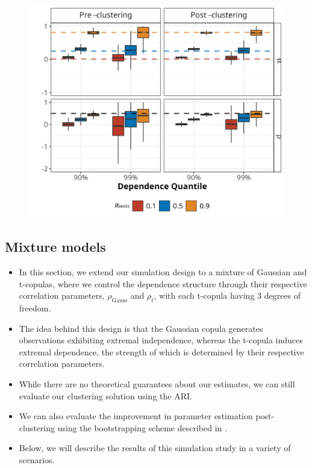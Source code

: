 \documentclass{article}
\numberwithin{equation}{section}
\begin{document}
\begin{figure}[H]
    \centering
    \includegraphics[width = 0.9\linewidth]{plots/sim_01_gauss_cop.png}
    \caption{\emph{}}
    \label{fig:00_gauss_cop}
\end{figure}


\subsection{Mixture models} \label{subsec:sim_mixture}

\begin{itemize}
  \item In this section, we extend our simulation design to a mixture of Gaussian and t-copulas, where we control the dependence structure through their respective correlation parameters, $\rho_{\text{Gauss}}$ and $\rho_{t}$, with each t-copula having 3 degrees of freedom.
  \item The idea behind this design is that the Gaussian copula generates observations exhibiting extremal independence, whereas the t-copula induces extremal dependence, the strength of which is determined by their respective correlation parameters.
  \item While there are no theoretical guarantees about our estimates, we can still evaluate our clustering solution using the ARI.
  \item We can also evaluate the improvement in parameter estimation post-clustering using the bootstrapping scheme described in \cite{Heffernan2004}.
  \item Below, we will describe the results of this simulation study in a variety of scenarios.
\end{itemize}
\end{document}
